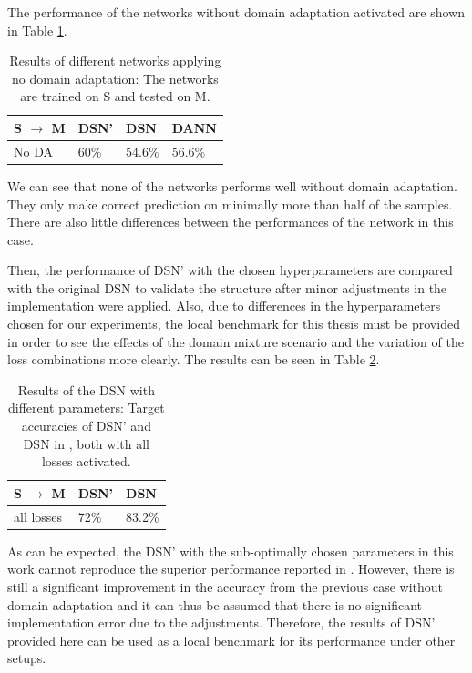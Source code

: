 The performance of the networks without domain adaptation activated are shown in Table \ref{tb:noda}.
\begin{table}[h!]
\begin{center}
\begin{tabular}{l|lll}
S $\rightarrow$ M& DSN' & DSN    & DANN   \\ \hline
No DA           & 60\% & 54.6\% & 56.6\% \\ 
\end{tabular}
\end{center}
\caption{Results of different networks applying no domain adaptation: The networks are trained on S and tested on M.}
\label{tb:noda}
\end{table}
We can see that none of the networks performs well without domain adaptation. They only make correct prediction on minimally more than half of the samples. There are also little differences between the performances of the network in this case.

Then, the performance of DSN' with the chosen hyperparameters are compared with the original DSN to validate the structure after minor adjustments in the implementation were applied. Also, due to differences in the hyperparameters chosen for our experiments, the local benchmark for this thesis must be provided in order to see the effects of the domain mixture scenario and the variation of the loss combinations more clearly. The results can be seen in Table \ref{tb:dsnResults}.
\begin{table}[h!]
\begin{center}
\begin{tabular}{l|ll} \label{tab:dsnResults}
S $\rightarrow$ M & DSN' & DSN    \\ \hline
all losses        & 72\% & 83.2\%
\end{tabular}
\end{center}
\caption{Results of the DSN with different parameters: Target accuracies of DSN' and DSN in \cite{DSN}, both with all losses activated.}
\label{tb:dsnResults}
\end{table}
As can be expected, the DSN' with the sub-optimally chosen parameters in this work cannot reproduce the superior performance reported in \cite{DSN}. However, there is still a significant improvement in the accuracy from the previous case without domain adaptation and it can thus be assumed that there is no significant implementation error due to the adjustments. Therefore, the results of DSN' provided here can be used as a local benchmark for its performance under other setups.


